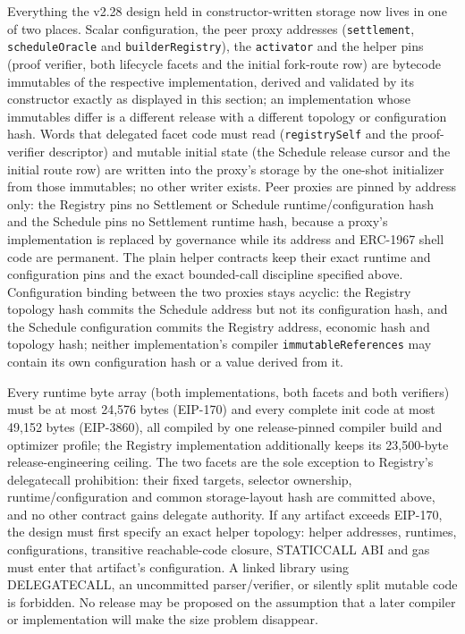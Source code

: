 \documentclass[a4paper,11pt]{article}
\newcommand{\code}[1]{\nolinkurl{#1}}
\begin{document}
Everything the v2.28 design held in constructor-written storage now lives in
one of two places.  Scalar configuration, the peer proxy addresses
(\code{settlement}, \code{scheduleOracle} and \code{builderRegistry}), the
\code{activator} and the helper pins (proof verifier, both lifecycle facets
and the initial fork-route row) are bytecode immutables of the respective
implementation, derived and validated by its constructor exactly as displayed
in this section; an implementation whose immutables differ is a different
release with a different topology or configuration hash.  Words that
delegated facet code must read (\code{registrySelf} and the proof-verifier
descriptor) and mutable initial state (the Schedule release cursor and the
initial route row) are written into the proxy's storage by the one-shot
initializer from those immutables; no other writer exists.  Peer proxies are
pinned by address only: the Registry pins no Settlement or Schedule
runtime/configuration hash and the Schedule pins no Settlement runtime hash,
because a proxy's implementation is replaced by governance while its address
and ERC-1967 shell code are permanent.  The plain helper contracts keep their
exact runtime and configuration pins and the exact bounded-call discipline
specified above.  Configuration binding between the two proxies stays
acyclic: the Registry topology hash commits the Schedule address but not its
configuration hash, and the Schedule configuration commits the Registry
address, economic hash and topology hash; neither implementation's compiler
\code{immutableReferences} may contain its own configuration hash or a value
derived from it.

Every runtime byte array (both implementations, both facets and both
verifiers) must be at most 24,576 bytes (EIP-170) and every complete init code
at most 49,152 bytes (EIP-3860), all compiled by one release-pinned compiler
build and optimizer profile; the Registry implementation additionally keeps
its 23,500-byte release-engineering ceiling.  The two facets are the sole
exception to Registry's delegatecall prohibition: their fixed targets,
selector ownership, runtime/configuration and common storage-layout hash are
committed above, and no other contract gains delegate authority.  If any
artifact exceeds EIP-170, the design must first specify an exact helper
topology: helper addresses, runtimes, configurations, transitive
reachable-code closure, STATICCALL ABI and gas must enter that artifact's
configuration.  A linked library using DELEGATECALL, an uncommitted
parser/verifier, or silently split mutable code is forbidden.  No release may
be proposed on the assumption that a later compiler or implementation will
make the size problem disappear.
\end{document}
